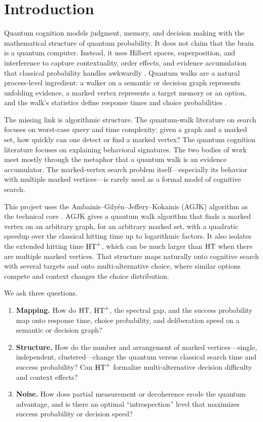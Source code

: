 \section{Introduction}
\label{sec:introduction}

Quantum cognition models judgment, memory, and decision making with the
mathematical structure of quantum probability. It does not claim that the brain
is a quantum computer. Instead, it uses Hilbert spaces, superposition, and
interference to capture contextuality, order effects, and evidence accumulation
that classical probability handles awkwardly \citep{pothos2022,busemeyer2024}.
Quantum walks are a natural process-level ingredient: a walker on a semantic or
decision graph represents unfolding evidence, a marked vertex represents a
target memory or an option, and the walk's statistics define response times and
choice probabilities \citep{chen2022,huang2022,pavone2025}.

The missing link is algorithmic structure. The quantum-walk literature on
search focuses on worst-case query and time complexity: given a graph and a
marked set, how quickly can one detect or find a marked vertex? The quantum
cognition literature focuses on explaining behavioral signatures. The two
bodies of work meet mostly through the metaphor that a quantum walk is an
evidence accumulator. The marked-vertex search problem itself---especially its
behavior with multiple marked vertices---is rarely used as a formal model of
cognitive search.

This project uses the Ambainis--Gily\'en--Jeffery--Kokainis (AGJK) algorithm as
the technical core \citep{agjk2019}. AGJK gives a quantum walk algorithm that
finds a marked vertex on an arbitrary graph, for an arbitrary marked set, with
a quadratic speedup over the classical hitting time up to logarithmic factors.
It also isolates the extended hitting time $\mathrm{HT}^+$, which can be much larger
than $\mathrm{HT}$ when there are multiple marked vertices. That structure maps
naturally onto cognitive search with several targets and onto multi-alternative
choice, where similar options compete and context changes the choice
distribution.

We ask three questions.
\begin{enumerate}[leftmargin=1.4em]
  \item \textbf{Mapping.} How do $\mathrm{HT}$, $\mathrm{HT}^+$, the spectral gap, and the
  success probability map onto response time, choice probability, and
  deliberation speed on a semantic or decision graph?
  \item \textbf{Structure.} How do the number and arrangement of marked
  vertices---single, independent, clustered---change the quantum versus
  classical search time and success probability? Can $\mathrm{HT}^+$ formalize
  multi-alternative decision difficulty and context effects?
  \item \textbf{Noise.} How does partial measurement or decoherence erode the
  quantum advantage, and is there an optimal ``introspection'' level that
  maximizes success probability or decision speed?
\end{enumerate}

